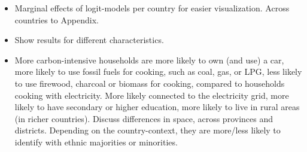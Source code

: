 \documentclass[12pt, a4paper]{article}
\begin{document}
\begin{itemize}
    \item Marginal effects of logit-models per country for easier visualization. Across countries to Appendix.
    \item Show results for different characteristics.
  \item More carbon-intensive households are more likely to own (and use) a car, more likely to use fossil fuels for cooking, such as coal, gas, or LPG, less likely to use firewood, charcoal or biomass for cooking, compared to households cooking with electricity. More likely connected to the electricity grid, more likely to have secondary or higher education, more likely to live in rural areas (in richer countries). Discuss differences in space, across provinces and districts. Depending on the country-context, they are more/less likely to identify with ethnic majorities or minorities.

\end{itemize}
\end{document}
